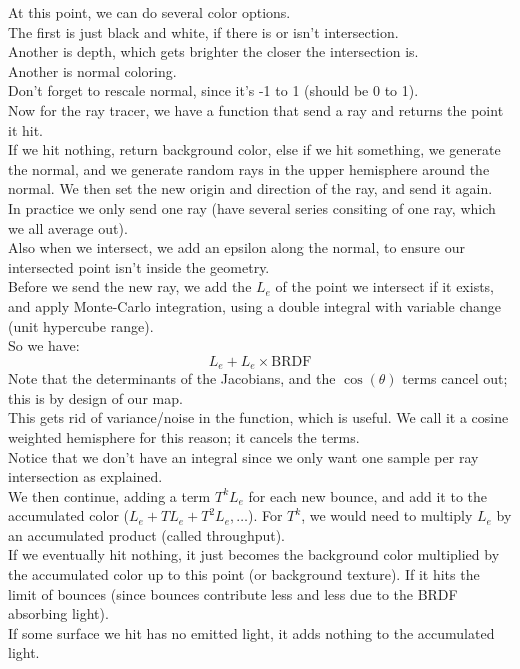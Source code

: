 \documentclass[12pt]{article}
\begin{document}
At this point, we can do several color options. \\

The first is just black and white, 
if there is or isn't intersection. \\

Another is depth, which gets brighter the closer
the intersection is. \\

Another is normal coloring. \\
Don't forget to rescale normal, since it's
-1 to 1 (should be 0 to 1). \\

Now for the ray tracer, we have a function
that send a ray and returns the point it hit. \\
If we hit nothing, return background color,
else if we hit something, we generate the normal,
and we generate random rays in the upper hemisphere
around the normal. We then set the new origin
and direction of the ray, and send it again. \\
In practice we only send one ray (have several
series consiting of one ray, which we all
average out). \\
Also when we intersect, we add an epsilon
along the normal, to ensure our intersected
point isn't inside the geometry. \\

Before we send the new ray, we
add the $L_e$ of the point we intersect
if it exists, and apply Monte-Carlo integration,
using a double integral with variable change
(unit hypercube range). \\
So we have:
\[ L_e + L_e \times \text{BRDF} \]
Note that the determinants of the Jacobians,
and the $\cos(\theta)$ terms cancel out;
this is by design of our map. \\
This gets rid of variance/noise in the function,
which is useful. 
We call it a cosine weighted hemisphere
for this reason; it cancels the terms. \\
Notice that we don't have an integral
since we only want one sample per ray
intersection as explained. \\
We then continue, adding a term $T^kL_e$
for each new bounce,
and add it to the accumulated color
($L_e + TL_e + T^2L_e, \dots$).
For $T^k$, we would need to multiply
$L_e$ by an accumulated product
(called throughput). \\
If we eventually hit nothing,
it just becomes the background color
multiplied by the accumulated color up
to this point (or background texture).
If it hits the limit of bounces (since bounces
contribute less and less due to the BRDF
absorbing light). \\
If some surface we hit has no emitted light,
it adds nothing to the accumulated light. \\
\end{document}
